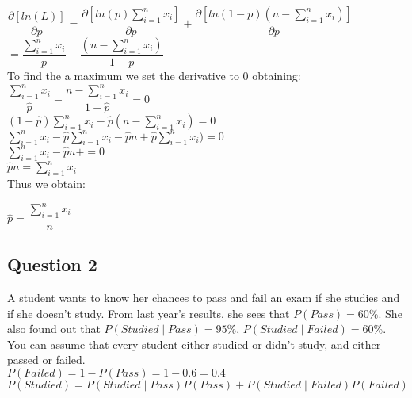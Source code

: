 \documentclass[12pt]{article}
\newcommand\tab[1][1cm]{\hspace*{#1}}
\begin{document}
$\dfrac{\partial[ln(L) ]}{\partial p} = \dfrac{\partial[ ln(p) \sum^{n}_{i = 1} x_i  ]}{\partial p} + \dfrac{\partial[ ln( 1-p) (n - \sum^{n}_{i = 1} x_i)]}{\partial p} $ \\ 

$ = \dfrac{\sum^{n}_{i = 1} x_i  }{p} - \dfrac{ (n - \sum^{n}_{i = 1} x_i) }{1 - p} $ \\

To find the a maximum we set the derivative to 0 obtaining: \\

$  \dfrac{\sum^{n}_{i = 1} x_i  }{\hat{p}} - \dfrac{ n - \sum^{n}_{i = 1} x_i }{1 - \hat{p}} = 0 $ \\

$ (1-\hat{p})\sum^{n}_{i = 1} x_i - \hat{p} (n - \sum^{n}_{i = 1} x_i) = 0 $ \\

$ \sum^{n}_{i = 1} x_i  - \hat{p}\sum^{n}_{i = 1} x_i - \hat{p}n + \hat{p} \sum^{n}_{i = 1} x_i) = 0 $ \\

$ \sum^{n}_{i = 1} x_i  - \hat{p}n + = 0 $ \\

$ \hat{p}n = \sum^{n}_{i = 1} x_i  $ \\

Thus we obtain: 

\begin{center}
$ \hat{p} = \dfrac{\sum^{n}_{i = 1} x_i}{n} $
\end{center}



\newpage
\begin{center}
\section*{Question 2}
\end{center}

\tab A student wants to know her chances to pass and fail an exam if she studies and if she doesn't study.  From last year's results, she sees that $P(Pass) = 60\%$. 
She also found out that 
$P(Studied \mid Pass) = 95\%$, 
$P(Studied \mid Failed) = 60\%$. 
You can assume that every student either studied or didn't study, and either passed or failed.\\

$P(Failed) = 1 -  P(Pass) = 1 - 0.6 = 0.4 $ \\

$P(Studied) = P(Studied \mid Pass) P(Pass) +  P(Studied \mid Failed) P(Failed)$
\end{document}
